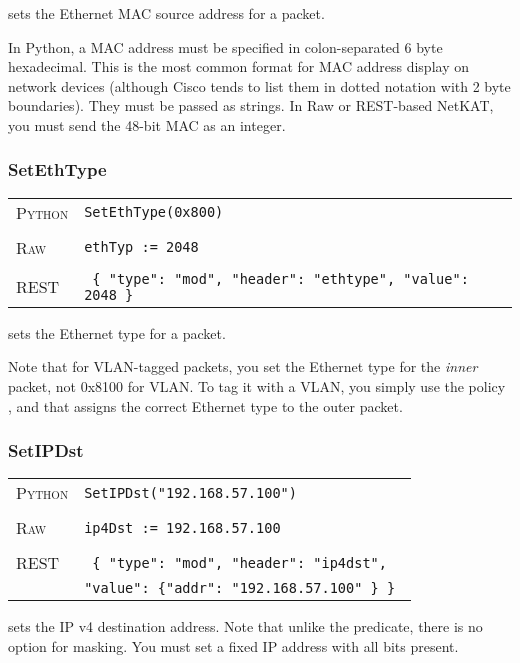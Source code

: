  sets the Ethernet MAC source address for a packet.    

In Python, a MAC address must be specified in colon-separated 6 byte hexadecimal.  This is the most common format
for MAC address display on network devices (although Cisco tends to list them in dotted notation with 2 byte
boundaries).  They must be passed as strings.  In Raw or REST-based NetKAT, you must send the 48-bit MAC as 
an integer.  

\subsubsection{SetEthType}

\bigskip
\begin{tabularx}{\linewidth}{lX}
\textsc{Python}   & \texttt{SetEthType(0x800)} \\ \\
\textsc{Raw}    & \texttt{ethTyp := 2048}     \\ \\
\textsc{REST} & \texttt{ \{ "type": "mod", "header": "ethtype", "value": 2048 \} }
\end{tabularx}

 sets the Ethernet type for a packet.    

Note that for VLAN-tagged packets, you set the Ethernet type for the \emph{inner} packet, not 0x8100
for VLAN.  To tag it with a VLAN, you simply use the policy , and that assigns the
correct Ethernet type to the outer packet.  

\subsubsection{SetIPDst}

\bigskip
\begin{tabularx}{\linewidth}{lX}
\textsc{Python}   & \texttt{SetIPDst("192.168.57.100")} \\ \\
\textsc{Raw}    & \texttt{ip4Dst := 192.168.57.100}     \\ \\
\textsc{REST} & \texttt{ \{ "type": "mod", "header": "ip4dst", } \\
  & \texttt{"value": \{"addr": "192.168.57.100" \} \} }
\end{tabularx}

 sets the IP v4 destination address.  Note that unlike the  predicate,
there is no option for masking.  You must set a fixed IP address with all bits present.    

